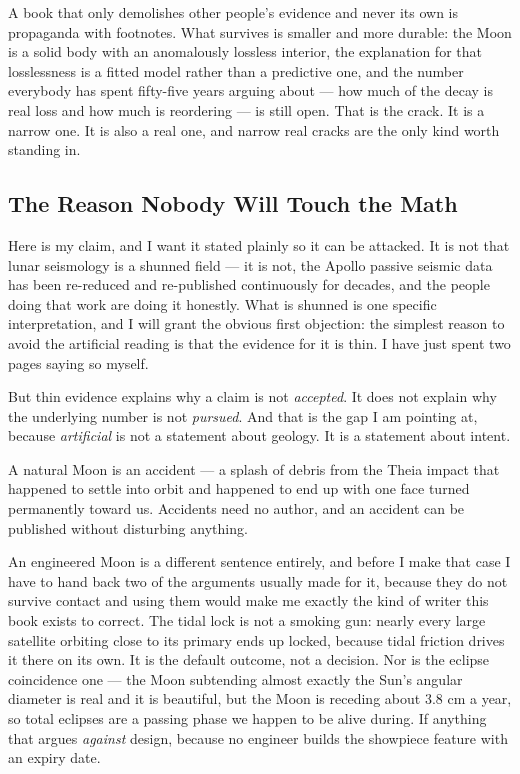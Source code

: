  A book that only
demolishes other people's evidence and never its own is propaganda with footnotes. What survives is
smaller and more durable: the Moon is a solid body with an anomalously lossless interior, the
explanation for that losslessness is a fitted model rather than a predictive one, and the number
everybody has spent fifty-five years arguing about --- how much of the decay is real loss and how
much is reordering --- is still open. That is the crack. It is a narrow one. It is also a real one,
and narrow real cracks are the only kind worth standing in.

\subsection{The Reason Nobody Will Touch the Math}\label{sec:whynobodytouches}

Here is my claim, and I want it stated plainly so it can be attacked. It is not that lunar
seismology is a shunned field --- it is not, the Apollo passive seismic data has been re-reduced and
re-published continuously for decades, and the people doing that work are doing it honestly. What is
shunned is one specific interpretation, and I will grant the obvious first objection: the simplest
reason to avoid the artificial reading is that the evidence for it is thin. I have just spent two
pages saying so myself.

But thin evidence explains why a claim is not \emph{accepted}. It does not explain why the underlying
number is not \emph{pursued}. And that is the gap I am pointing at, because \emph{artificial} is not a
statement about geology. It is a statement about intent.

A natural Moon is an accident --- a splash of debris from the Theia impact that happened to settle
into orbit and happened to end up with one face turned permanently toward us. Accidents need no
author, and an accident can be published without disturbing anything.

An engineered Moon is a different sentence entirely, and before I make that case I have to hand back
two of the arguments usually made for it, because they do not survive contact and using them would
make me exactly the kind of writer this book exists to correct. The tidal lock is not a smoking gun:
nearly every large satellite orbiting close to its primary ends up locked, because tidal friction
drives it there on its own. It is the default outcome, not a decision. Nor is the eclipse coincidence
one --- the Moon subtending almost exactly the Sun's angular diameter is real and it is beautiful,
but the Moon is receding about 3.8 cm a year, so total eclipses are a passing phase we happen to be
alive during. If anything that argues \emph{against} design, because no engineer builds the
showpiece feature with an expiry date.

